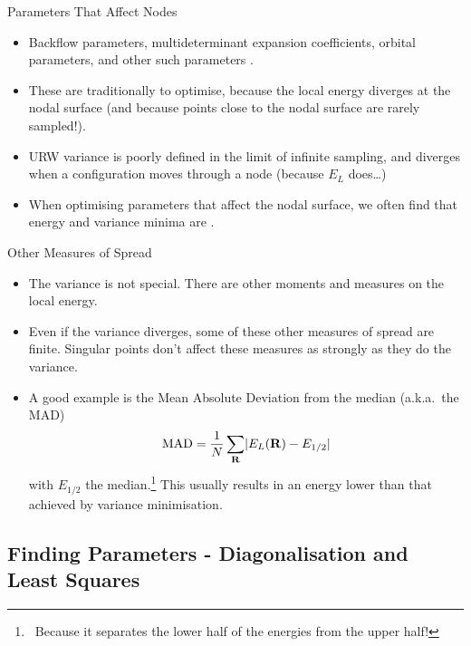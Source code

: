 \documentclass[12pt, pdf, hyperref={draft}, usenames, dvipsnames,
aspectratio=169]{beamer}
\newcommand{\red}[1]{{\bf\color{LancsRed}{#1}}}
\newcommand{\green}[1]{{\bf\color{ForestGreen}{#1}}}
\begin{document}
\begin{frame}{Parameters That Affect Nodes}

\begin{itemize}
  \item Backflow parameters, multideterminant expansion coefficients, orbital
  parameters, and other such parameters \red{affect the nodal surface of a
  trial wave function}.
  \item These are traditionally \red{hard} to optimise, because the local
  energy diverges at the nodal surface (and because points close to the nodal
  surface are rarely sampled!).
  \item URW variance is poorly defined in the limit of infinite sampling, and
  diverges when a configuration moves through a node (because $E_L$ does\ldots)
  \item When optimising parameters that affect the nodal surface, we often find
  that energy and variance minima are \red{significantly separated}.
\end{itemize}
\end{frame}


\begin{frame}{Other Measures of Spread}
\begin{itemize}
  \item The variance is not special. There are other moments and measures on the
  local energy.
  \item Even if the variance diverges, some of these other \green{robust}
  measures of spread are finite. Singular points don't affect these measures as
  strongly as they do the variance.
  \item A good example is the Mean Absolute Deviation from the median (a.k.a.\
  the MAD)
  \begin{equation}
    {\rm MAD} = \dfrac{1}{N}\sum_{\bf R} \lvert E_L({\bf R}) - E_{1/2}  \rvert
  \end{equation}
  with $E_{1/2}$ the median.\footnote{\ Because it separates the lower half of
  the energies from the upper half!} This usually results in an energy lower
  than that achieved by variance minimisation.
\end{itemize}
\end{frame}

\subsection{Finding Parameters - Diagonalisation and Least Squares}\label{sub:finding_parameters_diagonalisation_and_least_squares}
\end{document}
